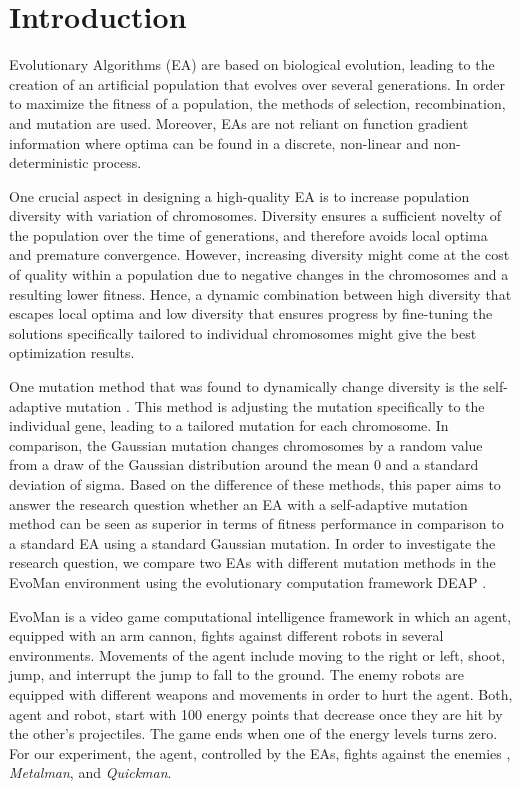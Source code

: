 \section{Introduction}

Evolutionary Algorithms (EA) are based on biological evolution, leading to the creation of an artificial population that evolves over several generations. In order to maximize the fitness of a population, the methods of selection, recombination, and mutation are used. Moreover, EAs are not reliant on function gradient information where optima can be found in a discrete, non-linear and non-deterministic process.\par

One crucial aspect in designing a high-quality EA is to increase population diversity with variation of chromosomes. Diversity ensures a sufficient novelty of the population over the time of generations, and therefore avoids local optima and premature convergence. However, increasing diversity might come at the cost of quality within a population due to negative changes in the chromosomes and a resulting lower fitness. Hence, a dynamic combination between high diversity that escapes local optima and low diversity that ensures progress by fine-tuning the solutions specifically tailored to individual chromosomes might give the best optimization results.\par

One mutation method that was found to dynamically change diversity is the self-adaptive mutation \cite{Teo2006SelfadaptiveMF}. This method is adjusting the mutation specifically to the individual gene, leading to a tailored mutation for each chromosome. In comparison, the Gaussian mutation changes chromosomes by a random value from a draw of the Gaussian distribution around the mean 0 and a standard deviation of sigma. Based on the difference of these methods, this paper aims to answer the research question whether an EA with a self-adaptive mutation method can be seen as superior in terms of fitness performance in comparison to a standard EA using a standard Gaussian mutation. In order to investigate the research question, we compare two EAs with different mutation methods in the EvoMan environment \cite{defranca2020evoman} using the evolutionary computation framework DEAP \cite{DEAP_JMLR2012}.\par

EvoMan \cite{defranca2020evoman} is a video game computational intelligence framework in which an agent, equipped with an arm cannon, fights against different robots in several environments. Movements of the agent include moving to the right or left, shoot, jump, and interrupt the jump to fall to the ground. The enemy robots are equipped with different weapons and movements in order to hurt the agent. Both, agent and robot, start with 100 energy points that decrease once they are hit by the other’s projectiles. The game ends when one of the energy levels turns zero. For our experiment, the agent, controlled by the EAs, fights against the enemies , \emph{Metalman}, and \emph{Quickman}.\par